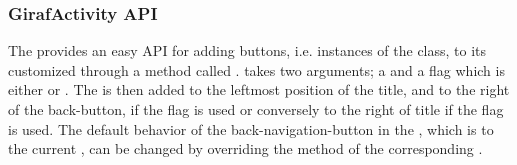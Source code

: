 \subsubsection{GirafActivity API}

The  provides an easy API for adding \giraf buttons, i.e. instances of the  class, to its customized  through a method called .  takes two arguments; a  and a flag which is either  or . The  is then added to the leftmost position of the title, and to the right of the back-button, if the  flag is used or conversely to the right of title if the  flag is used. 
The default behavior of the back-navigation-button in the , which is to  the current , can be changed by overriding the  method of the corresponding .          
